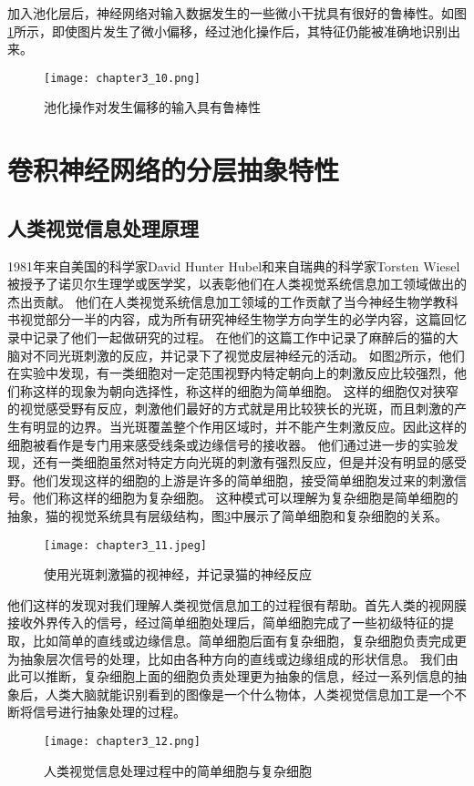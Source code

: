 加入池化层后，神经网络对输入数据发生的一些微小干扰具有很好的鲁棒性。如图\ref{fig:chapter3_10}所示，即使图片发生了微小偏移，经过池化操作后，其特征仍能被准确地识别出来。
\begin{figure}
    \centering
    \texttt{[image: chapter3\_10.png]}
    \caption{池化操作对发生偏移的输入具有鲁棒性\cite{luyujie_216}}
    \label{fig:chapter3_10}
\end{figure}

\section{卷积神经网络的分层抽象特性}
\subsection{人类视觉信息处理原理}
1981年来自美国的科学家David Hunter Hubel和来自瑞典的科学家Torsten Wiesel被授予了诺贝尔生理学或医学奖，以表彰他们在人类视觉系统信息加工领域做出的杰出贡献。
他们在人类视觉系统信息加工领域的工作贡献了当今神经生物学教科书视觉部分一半的内容，成为所有研究神经生物学方向学生的必学内容，这篇回忆录\cite{Hubel1998EarlyEO}中记录了他们一起做研究的过程。
在他们的这篇工作\cite{https://doi.org/10.1113/jphysiol.1959.sp006308}中记录了麻醉后的猫的大脑对不同光斑刺激的反应，并记录下了视觉皮层神经元的活动。
如图\ref{fig:chapter3_11}所示，他们在实验中发现，有一类细胞对一定范围视野内特定朝向上的刺激反应比较强烈，他们称这样的现象为朝向选择性，称这样的细胞为简单细胞。
这样的细胞仅对狭窄的视觉感受野有反应，刺激他们最好的方式就是用比较狭长的光斑，而且刺激的产生有明显的边界。当光斑覆盖整个作用区域时，并不能产生刺激反应。因此这样的细胞被看作是专门用来感受线条或边缘信号的接收器。
他们通过进一步的实验发现，还有一类细胞虽然对特定方向光斑的刺激有强烈反应，但是并没有明显的感受野。他们发现这样的细胞的上游是许多的简单细胞，接受简单细胞发过来的刺激信号。他们称这样的细胞为复杂细胞。
这种模式可以理解为复杂细胞是简单细胞的抽象，猫的视觉系统具有层级结构，图\ref{fig:chapter3_12}中展示了简单细胞和复杂细胞的关系。
\begin{figure}
    \centering
    \texttt{[image: chapter3\_11.jpeg]}
    \caption{使用光斑刺激猫的视神经，并记录猫的神经反应\cite{yanjianweishi}}
    \label{fig:chapter3_11}
\end{figure}

他们这样的发现对我们理解人类视觉信息加工的过程很有帮助。首先人类的视网膜接收外界传入的信号，经过简单细胞处理后，简单细胞完成了一些初级特征的提取，比如简单的直线或边缘信息。简单细胞后面有复杂细胞，复杂细胞负责完成更为抽象层次信号的处理，比如由各种方向的直线或边缘组成的形状信息。
我们由此可以推断，复杂细胞上面的细胞负责处理更为抽象的信息，经过一系列信息的抽象后，人类大脑就能识别看到的图像是一个什么物体，人类视觉信息加工是一个不断将信号进行抽象处理的过程。
\begin{figure}
    \centering
    \texttt{[image: chapter3\_12.png]}
    \caption{人类视觉信息处理过程中的简单细胞与复杂细胞\cite{yanjianweishi}}
    \label{fig:chapter3_12}
\end{figure}


